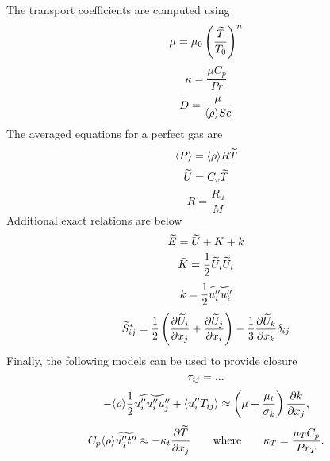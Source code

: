 \documentclass[oneside,a4paper,11pt]{report}
\begin{document}
The transport coefficients are computed using
\begin{equation}
    \mu = \mu_0 \left ( \frac{\widetilde{T}}{T_0} \right )^n
\end{equation}
\begin{equation}
    \kappa = \frac{\mu C_p}{Pr}
\end{equation}
\begin{equation}
    D = \frac{\mu}{\langle \rho \rangle Sc}
\end{equation}
The averaged equations for a perfect gas are
\begin{equation}
    \langle P \rangle = \langle \rho \rangle R \widetilde{T}
\end{equation}
\begin{equation}
    \widetilde{U} = C_v \widetilde{T}
\end{equation}
\begin{equation}    
    R = \frac{R_u}{M}
\end{equation}
Additional exact relations are below
\begin{equation} 
    \widetilde{E} = \widetilde{U} + \bar{K} + k 
\end{equation}
\begin{equation}    
    \bar{K} = \frac{1}{2} \widetilde{U}_i \widetilde{U}_i
\end{equation}
\begin{equation}    
    k = \frac{1}{2} \widetilde{u_i'' u_i''}
\end{equation}
\begin{equation}
    \widetilde{S}^*_{ij} = \frac{1}{2} \left ( \frac{\partial \widetilde{U}_i}{\partial x_j} + \frac{\partial \widetilde{U}_j}{\partial x_i} \right ) - \frac{1}{3} \frac{\partial \widetilde{U}_k}{\partial x_k} \delta_{ij}
\end{equation}
Finally, the following models can be used to provide closure
\begin{equation}
    \tau_{ij} = ...
\end{equation}
\begin{equation}
- \langle \rho \rangle \frac{1}{2} \widetilde{ u_i'' u_i'' u_j''} +  \langle u_i'' T_{ij} \rangle \approx \left(\mu + \frac{\mu_t}{\sigma_k}\right)\frac{\partial k}{\partial x_j},
\end{equation}
\begin{equation}
C_p \langle \rho \rangle \widetilde{ u_j'' t'' } \approx -\kappa_t\frac{\partial \widetilde{T}}{\partial x_j} \qquad \text{where} \qquad \kappa_T = \frac{\mu_T C_p}{Pr_T}.
\end{equation}

\end{document}
